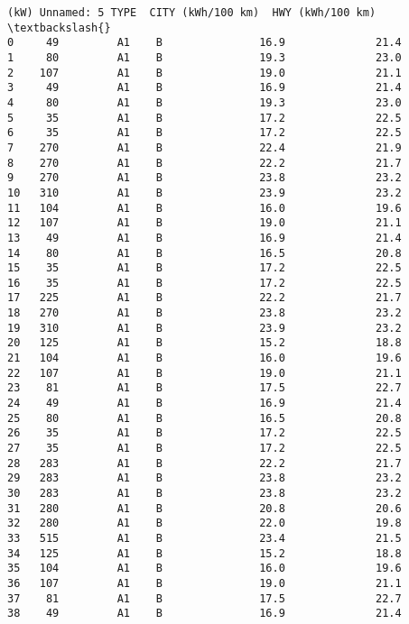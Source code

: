 \documentclass[11pt]{article}
\begin{document}
\begin{Verbatim}[commandchars=\\\{\}]
    (kW) Unnamed: 5 TYPE  CITY (kWh/100 km)  HWY (kWh/100 km)  \textbackslash{}
0     49         A1    B               16.9              21.4   
1     80         A1    B               19.3              23.0   
2    107         A1    B               19.0              21.1   
3     49         A1    B               16.9              21.4   
4     80         A1    B               19.3              23.0   
5     35         A1    B               17.2              22.5   
6     35         A1    B               17.2              22.5   
7    270         A1    B               22.4              21.9   
8    270         A1    B               22.2              21.7   
9    270         A1    B               23.8              23.2   
10   310         A1    B               23.9              23.2   
11   104         A1    B               16.0              19.6   
12   107         A1    B               19.0              21.1   
13    49         A1    B               16.9              21.4   
14    80         A1    B               16.5              20.8   
15    35         A1    B               17.2              22.5   
16    35         A1    B               17.2              22.5   
17   225         A1    B               22.2              21.7   
18   270         A1    B               23.8              23.2   
19   310         A1    B               23.9              23.2   
20   125         A1    B               15.2              18.8   
21   104         A1    B               16.0              19.6   
22   107         A1    B               19.0              21.1   
23    81         A1    B               17.5              22.7   
24    49         A1    B               16.9              21.4   
25    80         A1    B               16.5              20.8   
26    35         A1    B               17.2              22.5   
27    35         A1    B               17.2              22.5   
28   283         A1    B               22.2              21.7   
29   283         A1    B               23.8              23.2   
30   283         A1    B               23.8              23.2   
31   280         A1    B               20.8              20.6   
32   280         A1    B               22.0              19.8   
33   515         A1    B               23.4              21.5   
34   125         A1    B               15.2              18.8   
35   104         A1    B               16.0              19.6   
36   107         A1    B               19.0              21.1   
37    81         A1    B               17.5              22.7   
38    49         A1    B               16.9              21.4   

\end{Verbatim}
\end{document}
